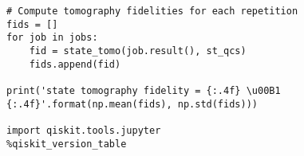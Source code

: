 \begin{verbatim}
# Compute tomography fidelities for each repetition
fids = []
for job in jobs:
    fid = state_tomo(job.result(), st_qcs)
    fids.append(fid)
    
print('state tomography fidelity = {:.4f} \u00B1 {:.4f}'.format(np.mean(fids), np.std(fids)))

import qiskit.tools.jupyter
%qiskit_version_table
\end{verbatim}